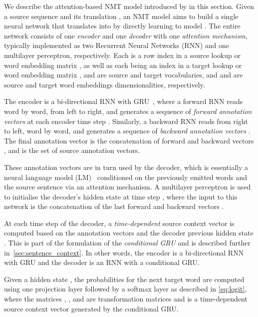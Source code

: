 \documentclass[11pt]{article}
\begin{document}
We describe the attention-based NMT model introduced by  in this section.
Given a source sequence  and
its translation ,
an NMT model aims to build a single neural network that translates  into  by directly learning to model .
The entire network consists of one \emph{encoder} and one \emph{decoder} with one \emph{attention mechanism}, typically implemented as two Recurrent Neural Networks (RNN) and one multilayer perceptron, respectively.
Each  is a row index in a source lookup or word embedding matrix
,
as well as each  being an index in a target lookup or word embedding matrix
,
 and  are source and target vocabularies, and  and  are source and target word embeddings dimensionalities, respectively.

The encoder is a bi-directional RNN with GRU~\cite{Choetal2014b}, where a forward RNN  reads  word by word, from left to right, and generates a sequence of \emph{forward annotation vectors}  at each encoder time step .
Similarly, a backward RNN  reads  from right to left, word by word, and generates a sequence of \emph{backward annotation vectors} .
The final annotation vector is the concatenation of forward and backward vectors , and  is the set of source annotation vectors.


These annotation vectors are in turn used by the decoder, which is essentially a neural language model (LM)~\cite{Bengioetal2003} conditioned on the previously emitted words and the source sentence via an attention mechanism.
A multilayer perceptron is used to initialise the decoder's hidden state  at time step , where the input to this network is the concatenation of the last forward and backward vectors .

At each time step  of the decoder, a \emph{time-dependent} source context vector  is computed based on the annotation vectors  and the decoder previous hidden state .
This is part of the formulation of the \textit{conditional GRU} and is described further in~\cref{sec:sentence_context}.
In other words, the encoder is a bi-directional RNN with GRU and the decoder is an RNN with a conditional GRU.

Given a hidden state ,
the probabilities for the next target word
are computed using one projection layer followed by a softmax layer as described in \cref{eq:logit},
where the matrices , ,  and  are transformation matrices and  is a time-dependent source context vector generated by the conditional GRU.


\begin{figure*}[ht!]\vspace{-10px}

\end{figure*}
\end{document}
